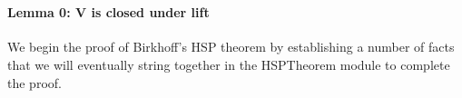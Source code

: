 \begin{code}
\AgdaSpace{}%
\AgdaSymbol{:}\AgdaSpace{}%
\AgdaSymbol{\}\{}\AgdaSpace{}%
\AgdaSymbol{:}\AgdaSpace{}%
\AgdaSpace{}%
\AgdaSpace{}%
\AgdaSymbol{\}(}\AgdaSpace{}%
\AgdaSymbol{:}\AgdaSpace{}%
\AgdaSpace{}%
\AgdaSpace{}%
\AgdaSymbol{)}\AgdaSpace{}%
\AgdaSpace{}%
\AgdaSpace{}%
\AgdaSpace{}%
\AgdaSymbol{\}}\<%
\\
%
\>[1]\AgdaSymbol{\{}\AgdaSpace{}%
\AgdaSymbol{:}\AgdaSpace{}%
\AgdaSymbol{\}}\AgdaSpace{}%
\AgdaSymbol{\{}\AgdaSpace{}%
\AgdaSymbol{:}\AgdaSpace{}%
\AgdaSpace{}%
\AgdaSymbol{\}}\<%
\\
%
\>[1]\<%
\\
%
\\[\AgdaEmptyExtraSkip]%
%
\\[\AgdaEmptyExtraSkip]%
\>[0]\AgdaSpace{}%
\AgdaSpace{}%
\AgdaSpace{}%
\AgdaSymbol{\{}\AgdaSpace{}%
\AgdaSymbol{=}\AgdaSpace{}%
\AgdaSymbol{\}\{}\AgdaSymbol{\}\{}\AgdaSymbol{\}}\AgdaSpace{}%
\<%
\\
\>[0]\<%
\end{code}

\paragraph{Lemma 0: V is closed under
lift}\label{lemma-0-v-is-closed-under-lift}

We begin the proof of Birkhoff's HSP theorem by establishing a number of
facts that we will eventually string together in the HSPTheorem module
to complete the proof.

